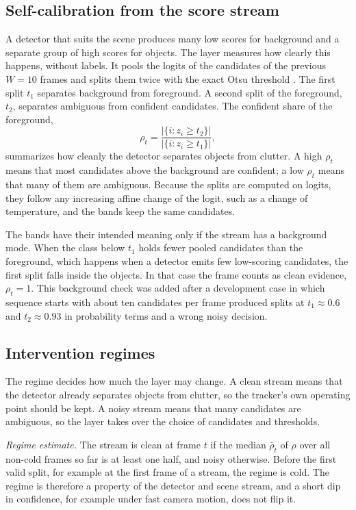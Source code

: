 \subsection{Self-calibration from the score stream}\label{sec:calib}
A detector that suits the scene produces many low scores for background and a
separate group of high scores for objects. The layer measures how clearly
this happens, without labels. It pools the logits of the candidates of the
previous $W=10$ frames and splits them twice with the exact Otsu threshold
\cite{otsu1979}. The first
split $t_1$ separates background from foreground. A second split of the
foreground, $t_2$, separates ambiguous from confident candidates. The
confident share of the foreground,
\begin{equation}
\rho_t=\frac{\left|\{i: z_i\ge t_2\}\right|}{\left|\{i: z_i\ge t_1\}\right|},
\label{eq:rho}
\end{equation}
summarizes how cleanly the detector separates objects from clutter. A high
$\rho_t$ means that most candidates above the background are confident; a low
$\rho_t$ means that many of them are ambiguous. Because
the splits are computed on logits, they follow any increasing affine change
of the logit, such as a change of temperature, and the bands keep the same
candidates.

The bands have their intended meaning only if the stream has a background
mode. When the class below $t_1$ holds fewer pooled candidates than the
foreground, which happens when a detector emits few low-scoring candidates, the
first split falls inside the objects. In that case the frame counts as clean
evidence, $\rho_t=1$. This background check was added after a development
case in which sequence starts with about ten candidates per frame produced
splits at $t_1\approx0.6$ and $t_2\approx0.93$ in probability terms and a
wrong noisy decision.

\subsection{Intervention regimes}\label{sec:regimes}
The regime decides how much the layer may change. A clean stream means that
the detector already separates objects from clutter, so the tracker's own
operating point should be kept. A noisy stream means that many candidates are
ambiguous, so the layer takes over the choice of candidates and thresholds.

\emph{Regime estimate.} The stream is clean at frame $t$ if the median
$\bar\rho_t$ of $\rho$ over all non-cold frames so far is at least one half,
and noisy otherwise. Before the first valid split, for example at the first
frame of a stream, the regime is cold. The regime is therefore a property of
the detector and scene stream, and a short dip in confidence, for example under fast camera
motion, does not flip it.

